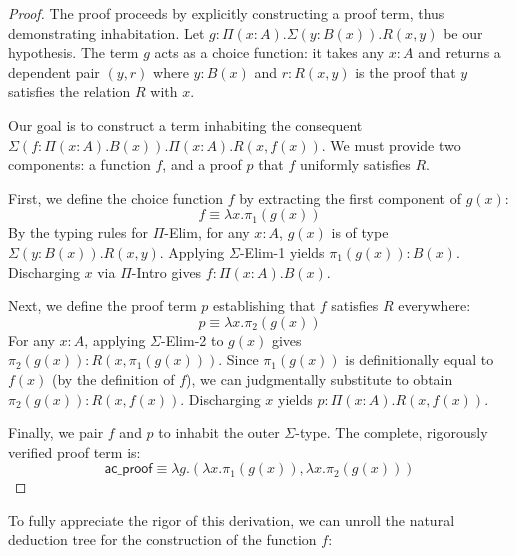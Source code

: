 \begin{proof}
The proof proceeds by explicitly constructing a proof term, thus demonstrating inhabitation. Let $g : \Pi(x:A). \Sigma(y:B(x)). R(x, y)$ be our hypothesis. The term $g$ acts as a choice function: it takes any $x : A$ and returns a dependent pair $(y, r)$ where $y : B(x)$ and $r : R(x, y)$ is the proof that $y$ satisfies the relation $R$ with $x$.

Our goal is to construct a term inhabiting the consequent $\Sigma(f:\Pi(x:A).B(x)). \Pi(x:A).R(x, f(x))$. We must provide two components: a function $f$, and a proof $p$ that $f$ uniformly satisfies $R$.

First, we define the choice function $f$ by extracting the first component of $g(x)$:
\[
f \equiv \lambda x. \pi_1(g(x))
\]
By the typing rules for $\Pi$-Elim, for any $x : A$, $g(x)$ is of type $\Sigma(y:B(x)). R(x, y)$. Applying $\Sigma$-Elim-1 yields $\pi_1(g(x)) : B(x)$. Discharging $x$ via $\Pi$-Intro gives $f : \Pi(x:A).B(x)$.

Next, we define the proof term $p$ establishing that $f$ satisfies $R$ everywhere:
\[
p \equiv \lambda x. \pi_2(g(x))
\]
For any $x : A$, applying $\Sigma$-Elim-2 to $g(x)$ gives $\pi_2(g(x)) : R(x, \pi_1(g(x)))$. Since $\pi_1(g(x))$ is definitionally equal to $f(x)$ (by the definition of $f$), we can judgmentally substitute to obtain $\pi_2(g(x)) : R(x, f(x))$. Discharging $x$ yields $p : \Pi(x:A).R(x, f(x))$.

Finally, we pair $f$ and $p$ to inhabit the outer $\Sigma$-type. The complete, rigorously verified proof term is:
\[
\mathsf{ac\_proof} \equiv \lambda g. (\lambda x. \pi_1(g(x)), \lambda x. \pi_2(g(x)))
\]
\end{proof}

To fully appreciate the rigor of this derivation, we can unroll the natural deduction tree for the construction of the function $f$:
\begin{mathpar}
\end{mathpar}

